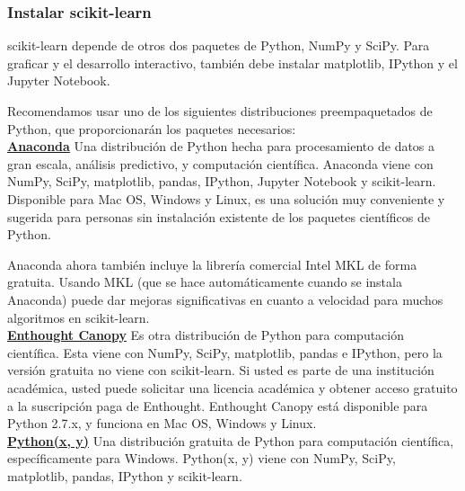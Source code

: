     
  
    

\subsubsection{Instalar scikit-learn}

scikit-learn depende de otros dos paquetes de Python, NumPy y SciPy. Para  graficar y el desarrollo interactivo, también debe instalar matplotlib, IPython y el Jupyter Notebook. 

Recomendamos usar uno de los siguientes distribuciones  preempaquetados de Python, que proporcionarán los paquetes necesarios:\\



\href{https://store.continuum.io/cshop/anaconda/}{\color{vino} \bf Anaconda}  Una distribución de Python hecha para procesamiento de datos a gran escala, análisis predictivo,
y computación científica. Anaconda  viene con NumPy, SciPy, matplotlib, pandas, IPython, Jupyter Notebook y scikit-learn. Disponible para  Mac OS, Windows y Linux, es una solución muy conveniente y sugerida para personas sin instalación existente de los paquetes científicos de Python. 

Anaconda ahora  también incluye la librería  comercial Intel MKL de forma gratuita. Usando MKL
(que se hace automáticamente cuando se instala Anaconda) puede dar mejoras significativas en cuanto a  velocidad para muchos algoritmos en scikit-learn.\\


\href{https://www.enthought.com/http:/www.enthought.com}{\color{vino} \bf Enthought Canopy}   Es otra distribución de Python para computación científica.   Esta viene con NumPy, SciPy, matplotlib,
 pandas e IPython, pero la versión gratuita no viene con scikit-learn. Si usted es parte de una institución académica, usted puede solicitar una licencia académica y obtener acceso gratuito a la suscripción paga de  Enthought. Enthought Canopy  está disponible para Python 2.7.x, y
funciona en Mac OS, Windows y Linux.\\


\href{http://python-xy.github.io/}{\color{vino} \bf Python(x, y)}    Una distribución gratuita de Python para computación científica, específicamente para Windows.
Python(x, y)   viene con NumPy, SciPy, matplotlib, pandas, IPython y scikit-learn.\\


